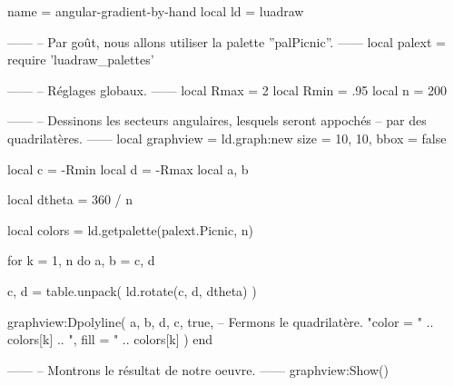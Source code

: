 \documentclass{standalone}
\begin{document}
\begin{luadraw*}{name = angular-gradient-by-hand}
local ld = luadraw

------
-- Par goût, nous allons utiliser la palette ''palPicnic''.
------
local palext = require 'luadraw_palettes'

------
-- Réglages globaux.
------
local Rmax = 2
local Rmin = .95
local n    = 200

------
-- Dessinons les secteurs angulaires, lesquels seront appochés
-- par des quadrilatères.
------
local graphview = ld.graph:new{
  size = {10, 10},
  bbox = false
}

local c = -Rmin
local d = -Rmax
local a, b

local dtheta = 360 / n

local colors = ld.getpalette(palext.Picnic, n)

for k = 1, n do
  a, b = c, d

  c, d = table.unpack(
    ld.rotate({c, d}, dtheta)
  )

  graphview:Dpolyline(
    {a, b, d, c},
    true,           -- Fermons le quadrilatère.
      "color = "
    .. colors[k]
    .. ", fill = "
    .. colors[k]
  )
end

------
-- Montrons le résultat de notre oeuvre.
------
graphview:Show()
\end{luadraw*}
\end{document}
